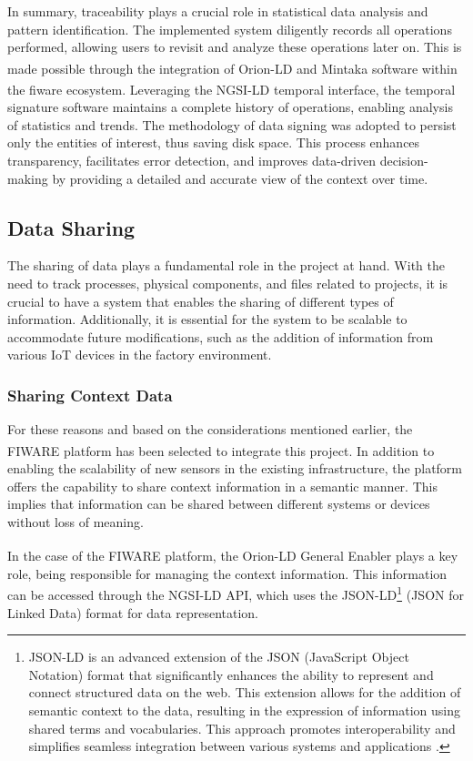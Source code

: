 In summary, traceability plays a crucial role in statistical data analysis and pattern identification. The implemented system diligently records all operations performed, allowing users to revisit and analyze these operations later on. This is made possible through the integration of Orion-LD\textsuperscript{\textregistered} and Mintaka\textsuperscript{\textregistered} software within the \acrshort{fiware}\textsuperscript{\textregistered} ecosystem. Leveraging the NGSI-LD temporal interface, the temporal signature software maintains a complete history of operations, enabling analysis of statistics and trends. The methodology of data signing was adopted to persist only the entities of interest, thus saving disk space. This process enhances transparency, facilitates error detection, and improves data-driven decision-making by providing a detailed and accurate view of the context over time.

\subsection{Data Sharing}\label{section:softwareArchitecture-data_sharing}
The sharing of data plays a fundamental role in the project at hand. With the need to track processes, physical components, and files related to projects, it is crucial to have a system that enables the sharing of different types of information. Additionally, it is essential for the system to be scalable to accommodate future modifications, such as the addition of information from various IoT devices in the factory environment.


\subsubsection{Sharing Context  Data}
For these reasons and based on the considerations mentioned earlier, the FIWARE\textsuperscript{\textregistered} platform has been selected to integrate this project. In addition to enabling the scalability of new sensors in the existing infrastructure, the platform offers the capability to share context information in a semantic manner. This implies that information can be shared between different systems or devices without loss of meaning.

In the case of the FIWARE\textsuperscript{\textregistered} platform, the Orion-LD General Enabler plays a key role, being responsible for managing the context information. This information can be accessed through the NGSI-LD API, which uses the JSON-LD\footnote{JSON-LD is an advanced extension of the JSON (JavaScript Object Notation) format that significantly enhances the ability to represent and connect structured data on the web. This extension allows for the addition of semantic context to the data, resulting in the expression of information using shared terms and vocabularies. This approach promotes interoperability and simplifies seamless integration between various systems and applications \cite{Lanthaler2012, sporny2020json}.} (JSON for Linked Data) format for data representation.

